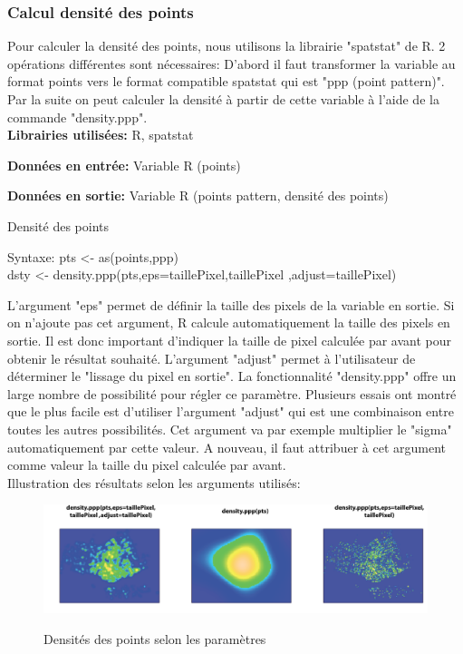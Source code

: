 \subsubsection{Calcul densité des points}

Pour calculer la densité des points, nous utilisons la librairie "spatstat" de R. 2 opérations différentes sont nécessaires: D'abord il faut transformer la variable au format points vers le format compatible spatstat qui est "ppp (point pattern)". Par la suite on peut calculer la densité à partir de cette variable à l'aide de la commande "density.ppp".\\

\textbf{Librairies utilisées:} R, spatstat

\textbf{Données en entrée:}  Variable R (points)

\textbf{Données en sortie:} Variable R (points pattern, densité des points)\\

\begin{algorithm}[H]
\caption{\label{traitementdesite} Densité des points}
Syntaxe:
pts <- as(points,ppp)\\
dsty <- density.ppp(pts,eps=taillePixel,taillePixel ,adjust=taillePixel)\\
\end{algorithm}

L'argument "eps" permet de définir la taille des pixels de la variable en sortie. Si on n'ajoute pas cet argument, R calcule automatiquement la taille des pixels en sortie. Il est donc important d'indiquer la taille de pixel calculée par avant pour obtenir le résultat souhaité. 
L'argument "adjust" permet à l'utilisateur de déterminer le "lissage du pixel en sortie". La fonctionnalité "density.ppp" offre un large nombre de possibilité pour régler ce paramètre. Plusieurs essais ont montré que le plus facile est d'utiliser l'argument "adjust" qui est une combinaison entre toutes les autres possibilités. Cet argument va par exemple multiplier le "sigma" automatiquement par cette valeur. A nouveau, il faut attribuer à cet argument comme valeur la taille du pixel calculée par avant.\\
Illustration des résultats selon les arguments utilisés:

\begin{center}
\begin{figure}[h] \centering
\includegraphics[width=16cm]{3Densites}\\
\caption{\label{3densites} Densités des points selon les paramètres}
\end{figure}
\end{center}

